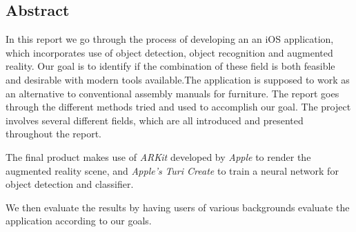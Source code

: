 \begin{center}
\section*{Abstract}
In this report we go through the process of developing an an iOS application, which incorporates use of object detection, object recognition and augmented reality. Our goal is to identify if the combination of these field is both feasible and desirable with modern tools available.The application is supposed to work as an alternative to conventional assembly manuals for furniture. The report goes through the different methods tried and used to accomplish our goal. The project involves several different fields, which are all introduced and presented throughout the report. 

The final product makes use of \textit{ARKit} developed by \textit{Apple} to render the augmented reality scene, and \textit{Apple's} \textit{Turi Create} to train a neural network for object detection and classifier. 

We then evaluate the results by having users of various backgrounds evaluate the application according to our goals.
\end{center}



\newpage